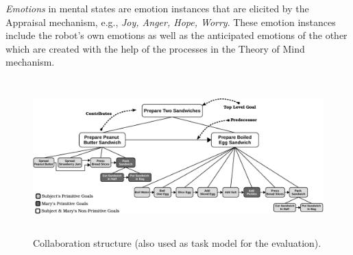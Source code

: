\documentclass{article}
\begin{document}

\textit{Emotions} in mental states are emotion instances that are elicited by
the Appraisal mechanism, e.g., \textit{Joy, Anger, Hope, Worry}. These emotion
instances include the robot's own emotions as well as the anticipated emotions
of the other which are created with the help of the processes in the Theory of
Mind mechanism. 


\begin{figure}
  \centering
  \vspace*{-5mm}
  \includegraphics[width=16.5cm,height=6cm]{figure/taskModel-croped.pdf}
  \vspace*{-3mm}
  \caption{Collaboration structure (also used as task model for
  the evaluation).}
  \label{fig:taskModel}
  \vspace*{-4mm}
\end{figure}
\end{document}
